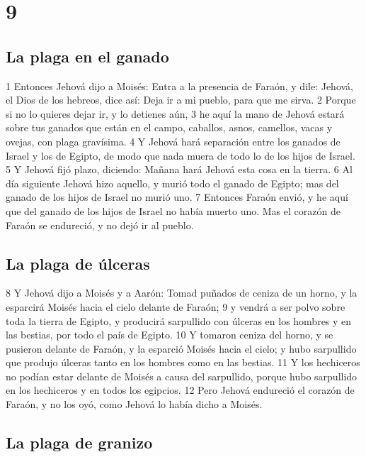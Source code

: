 \chapter{9}

\section*{La plaga en el ganado}

1 Entonces Jehová dijo a Moisés: Entra a la presencia de Faraón, y dile: Jehová, el Dios de los hebreos, dice así: Deja ir a mi pueblo, para que me sirva.
2 Porque si no lo quieres dejar ir, y lo detienes aún,
3 he aquí la mano de Jehová estará sobre tus ganados que están en el campo, caballos, asnos, camellos, vacas y ovejas, con plaga gravísima.
4 Y Jehová hará separación entre los ganados de Israel y los de Egipto, de modo que nada muera de todo lo de los hijos de Israel.
5 Y Jehová fijó plazo, diciendo: Mañana hará Jehová esta cosa en la tierra.
6 Al día siguiente Jehová hizo aquello, y murió todo el ganado de Egipto; mas del ganado de los hijos de Israel no murió uno.
7 Entonces Faraón envió, y he aquí que del ganado de los hijos de Israel no había muerto uno. Mas el corazón de Faraón se endureció, y no dejó ir al pueblo.

\section*{La plaga de úlceras}

8 Y Jehová dijo a Moisés y a Aarón: Tomad puñados de ceniza de un horno, y la esparcirá Moisés hacia el cielo delante de Faraón;
9 y vendrá a ser polvo sobre toda la tierra de Egipto, y producirá sarpullido con úlceras en los hombres y en las bestias, por todo el país de Egipto.
10 Y tomaron ceniza del horno, y se pusieron delante de Faraón, y la esparció Moisés hacia el cielo; y hubo sarpullido que produjo úlceras tanto en los hombres como en las bestias.
11 Y los hechiceros no podían estar delante de Moisés a causa del sarpullido, porque hubo sarpullido en los hechiceros y en todos los egipcios.
12 Pero Jehová endureció el corazón de Faraón, y no los oyó, como Jehová lo había dicho a Moisés.

\section*{La plaga de granizo}


